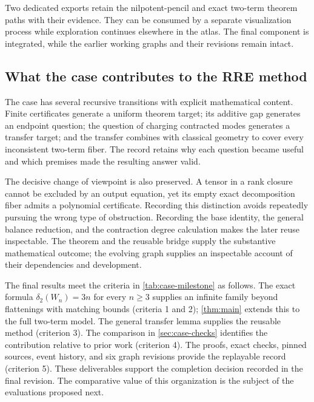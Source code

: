 Two dedicated exports retain the nilpotent-pencil and exact two-term theorem paths with their evidence. They can be consumed by a separate visualization process while exploration continues elsewhere in the atlas. The final component is integrated, while the earlier working graphs and their revisions remain intact.

\subsection{What the case contributes to the RRE method}

The case has several recursive transitions with explicit mathematical content. Finite certificates generate a uniform theorem target; its additive gap generates an endpoint question; the question of charging contracted modes generates a transfer target; and the transfer combines with classical geometry to cover every inconsistent two-term fiber. The record retains why each question became useful and which premises made the resulting answer valid.

The decisive change of viewpoint is also preserved. A tensor in a rank closure cannot be excluded by an output equation, yet its empty exact decomposition fiber admits a polynomial certificate. Recording this distinction avoids repeatedly pursuing the wrong type of obstruction. Recording the base identity, the general balance reduction, and the contraction degree calculation makes the later reuse inspectable. The theorem and the reusable bridge supply the substantive mathematical outcome; the evolving graph supplies an inspectable account of their dependencies and development. 

The final results meet the criteria in \cref{tab:case-milestone} as follows. The exact formula $\delta_2(W_n)=3n$ for every $n\ge3$ supplies an infinite family beyond flattenings with matching bounds (criteria 1 and 2); \cref{thm:main} extends this to the full two-term model. The general transfer lemma supplies the reusable method (criterion 3). The comparison in \cref{sec:case-checks} identifies the contribution relative to prior work (criterion 4). The proofs, exact checks, pinned sources, event history, and six graph revisions provide the replayable record (criterion 5). These deliverables support the completion decision recorded in the final revision. The comparative value of this organization is the subject of the evaluations proposed next.
